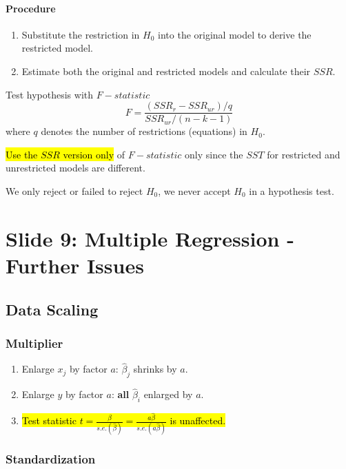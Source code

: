 \documentclass[]{article}
\begin{document}
    	\paragraph{Procedure}
    		\begin{enumerate}
    			\item Substitute the restriction in $H_0$ into the original model to derive the restricted model.
    			\item Estimate both the original and restricted models and calculate their $SSR$.
    		\end{enumerate}
    		Test hypothesis with $F-statistic$
    		\[
    			F = \frac{(SSR_r - SSR_{ur})/q}{SSR_{ur}/(n-k-1)}
    		\]
    		where $q$ denotes the number of restrictions (equations) in $H_0$.
    	\begin{remark}
    		\hl{Use the $SSR$ version only} of $F-statistic$ only since the $SST$ for restricted and unrestricted models are different.
    	\end{remark}
    	\begin{remark}
    		We only reject or failed to reject $H_0$, we never accept $H_0$ in a hypothesis test.
    	\end{remark}
    	
    \section{Slide 9: Multiple Regression - Further Issues}
    	\subsection{Data Scaling}
    		\subsubsection{Multiplier}
    		\begin{enumerate}
    			\item Enlarge $x_j$ by factor $a$: $\hat{\beta}_j$ shrinks by $a$.
    			\item Enlarge $y$ by factor $a$: \textbf{all} $\hat{\beta}_i$ enlarged by $a$.
    			\item \hl{Test statistic $t = \frac{\hat{\beta}}{s.e.(\hat{\beta})} = \frac{a\hat{\beta}}{s.e.(a \hat{\beta})}$ is unaffected.}
    		\end{enumerate}
    	
    		\subsubsection{Standardization}
\end{document}
